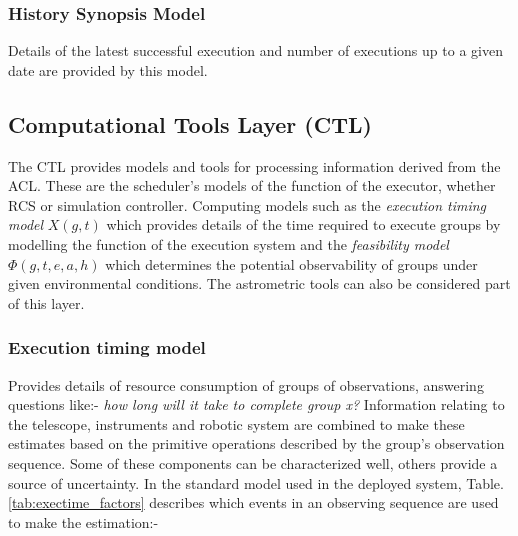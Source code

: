 \subsubsection{History Synopsis Model}
Details of the latest successful execution and number of executions up to a given date are provided by this model.

\subsection{Computational Tools Layer (CTL)}
The CTL provides models and tools for processing information derived from the ACL. These are the scheduler's models of the function of the executor, whether RCS or simulation controller. Computing models such as the \emph{execution timing model} $X(g,t)$ which provides details of the time required to execute groups by modelling the function of the execution system and the \emph{feasibility model} $\Phi(g,t,e,a,h)$ which determines the potential observability of groups under given environmental conditions. The astrometric tools can also be considered part of this layer.

\subsubsection{Execution timing model}
\label{sect:sub_xtm}
Provides details of resource consumption of groups of observations, answering questions like:- \emph{how long will it take to complete group x?} Information relating to the telescope, instruments and robotic system are combined to make these estimates based on the primitive operations described by the group's observation sequence. Some of these components can be characterized well, others provide a source of uncertainty. In the standard model used in the deployed system, Table.~ \ref{tab:exectime_factors} describes which events in an observing sequence are used to make the estimation:-


